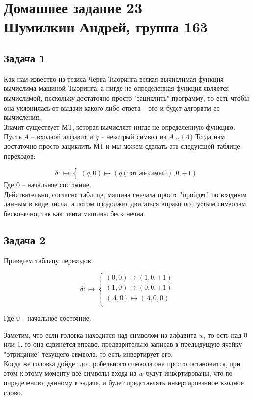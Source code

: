

	\section{Домашнее задание 23\\ Шумилкин Андрей, группа 163} 
	\subsection{Задача 1}
	Как нам известно из тезиса Чёрна-Тьюринга всякая вычислимая функция вычислима машиной Тьюринга, а нигде не определенная функция является вычислимой, поскольку достаточно просто "зациклить" программу, то есть чтобы она уклонилась от выдачи какого-либо ответа  -- это и будет алгоритм ее вычисления. \\
	Значит существует МТ, которая вычисляет нигде не определенную функцию. \\
	Пусть $A$ -- входной алфавит и $q$ -- некотрый символ из $A \cup \{\Lambda\}$
	Тогда нам достаточно просто зациклить МТ и мы можем сделать это следующей таблице переходов:
	
	\[\delta: \mapsto
	\begin{cases}
	(q, 0) \mapsto (q(тот\ же\ самый), 0, +1)
	\end{cases}
	\]
	Где 0 -- начальное состояние. \\
	Действительно, согласно таблице, машина сначала просто "пройдет" по входным данным в виде числа, а потом продолжит двигаться вправо по пустым символам бесконечно, так как лента машины бесконечна. 
	
	\subsection{Задача 2}
	
	Приведем таблицу переходов:
	
	\[\delta: \mapsto
	\begin{cases}
	(0, 0) \mapsto (1, 0, +1) \\
	(1, 0) \mapsto (0, 0, +1) \\
	(\Lambda, 0) \mapsto (\Lambda, 0, 0) \\
	\end{cases}
	\]
	
	Где 0 -- начальное состояние.
	
	Заметим, что если головка находится над символом из алфавита $w$, то есть над 0 или 1, то она сдвинется вправо, предварительно записав в предыдущую ячейку "отрицание" текущего символа, то есть инвертирует его. \\
	Когда же головка дойдет до пробельного символа она просто остановится, при этом к этому моменту все символы входа из $w$ будут инвертированы, что по определению, данному в задаче, и будет представлять инвертированное входное слово. 
	
